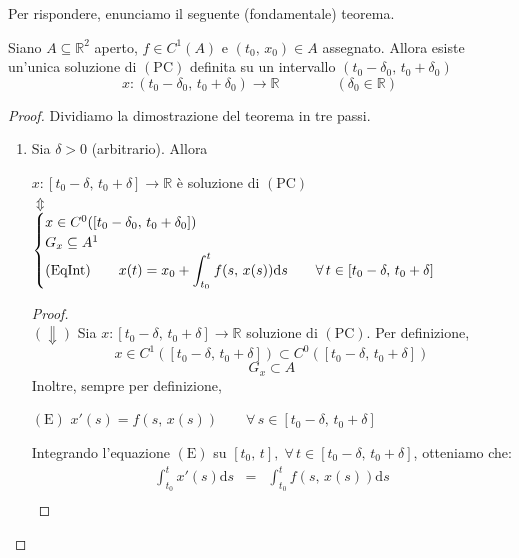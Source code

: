 Per rispondere, enunciamo il seguente (fondamentale) teorema.

\begin{thm}
Siano $A \subseteq \mathbb{R}^2$ aperto, $f \in C^1(A)$ e $(t_0,\,x_0) \in A$ assegnato. Allora esiste un'unica soluzione di $\mathrm{(PC)}$ definita su un intervallo $(t_0-\delta_0,\,t_0+\delta_0)$
$$
x : (t_0-\delta_0,\,t_0+\delta_0) \longrightarrow \mathbb{R} \qquad\qquad (\delta_0 \in \mathbb{R})
$$
\end{thm}
\begin{proof}
Dividiamo la dimostrazione del teorema in tre passi.
\begin{enumerate}[labelindent=\parindent,leftmargin=*,label=\textnormal{\underline{Passo \arabic*}.},start=1]
	\item Sia $\delta > 0$ (arbitrario). Allora 
	\begin{center}
	$x:[t_0-\delta,\,t_0+\delta] \longrightarrow \mathbb{R}$ è soluzione di $\mathrm{(PC)}$\\
	$\Updownarrow$\\
	$
	\begin{cases}
	x \in C^0([t_0-\delta_0,\,t_0+\delta_0])\\
	G_x \subseteq A\footnotemark\\
	\mathrm{(EqInt)} \qquad \displaystyle x(t) = x_0 + \int_{t_0}^t f(s,\,x(s)) \mathrm{d}s & \quad \forall \, t \in [t_0-\delta,\,t_0+\delta]
	\end{cases}
	$
	\end{center}
	\begin{proof}\mbox{}\\
	$(\Downarrow)$ Sia $x:[t_0-\delta,\,t_0+\delta] \longrightarrow \mathbb{R}$ soluzione di $\mathrm{(PC)}$. Per definizione,
	$$
	x \in C^1([t_0-\delta,\,t_0+\delta]) \subset C^0([t_0-\delta,\,t_0+\delta])
	$$
	$$
	G_x \subset A
	$$
	Inoltre, sempre per definizione,
	\begin{center}
	$\mathrm{(E)}$
	\hfill
	$\displaystyle
	x'(s) = f(s,\,x(s)) \qquad \forall \, s \in [t_0-\delta,\,t_0+\delta]
	$
	\hfill \null \\
	\end{center}
	Integrando l'equazione $\mathrm{(E)}$ su $[t_0,\,t], \; \forall \, t \in [t_0-\delta,\,t_0+\delta]$, otteniamo che:
	$$
	\begin{array}{ccc}
	\displaystyle \int_{t_0}^t x'(s) \mathrm{d}s &=& \displaystyle \int_{t_0}^t f(s,\,x(s)) \mathrm{d}s\\

\end{array}$$
\end{proof}
\end{enumerate}
\end{proof}
